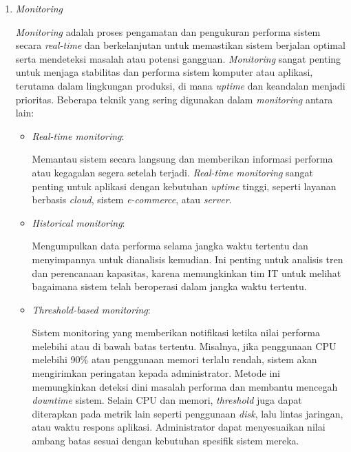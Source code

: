 \documentclass[12pt]{article}
\begin{document}
\begin{enumerate}
\begin{enumerate}
            \item \textit{Monitoring}
            \par \textit{Monitoring} adalah proses pengamatan dan pengukuran performa sistem secara \textit{real-time} dan berkelanjutan untuk memastikan sistem berjalan optimal serta mendeteksi masalah atau potensi gangguan\cite{3.2.4Wikimedia2023}. \textit{Monitoring} sangat penting untuk menjaga stabilitas dan performa sistem komputer atau aplikasi, terutama dalam lingkungan produksi, di mana \textit{uptime} dan keandalan menjadi prioritas. Beberapa teknik yang sering digunakan dalam \textit{monitoring} antara lain:
            \begin{itemize}
                \item \textit{Real-time monitoring}:
                \par Memantau sistem secara langsung dan memberikan informasi performa atau kegagalan segera setelah terjadi. \textit{Real-time monitoring} sangat penting untuk aplikasi dengan kebutuhan \textit{uptime} tinggi, seperti layanan berbasis \textit{cloud}, sistem \textit{e-commerce}, atau \textit{server}.
                \item \textit{Historical monitoring}:
                \par Mengumpulkan data performa selama jangka waktu tertentu dan menyimpannya untuk dianalisis kemudian. Ini penting untuk analisis tren dan perencanaan kapasitas, karena memungkinkan tim IT untuk melihat bagaimana sistem telah beroperasi dalam jangka waktu tertentu.
                \item \textit{Threshold-based monitoring}:
                \par Sistem monitoring yang memberikan notifikasi ketika nilai performa melebihi atau di bawah batas tertentu. Misalnya, jika penggunaan CPU melebihi 90\% atau penggunaan memori terlalu rendah, sistem akan mengirimkan peringatan kepada administrator. Metode ini memungkinkan deteksi dini masalah performa dan membantu mencegah \textit{downtime} sistem. Selain CPU dan memori, \textit{threshold} juga dapat diterapkan pada metrik lain seperti penggunaan \textit{disk}, lalu lintas jaringan, atau waktu respons aplikasi. Administrator dapat menyesuaikan nilai ambang batas sesuai dengan kebutuhan spesifik sistem mereka.
            \end{itemize}
            

\end{enumerate}
\end{enumerate}
\end{document}
